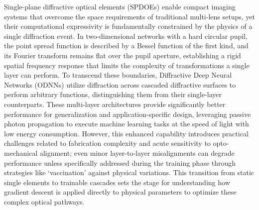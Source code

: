 \documentclass[11pt]{article}
\begin{document}
Single-plane diffractive optical elements (SPDOEs) enable compact imaging systems that overcome the space requirements of traditional multi-lens setups, yet their computational expressivity is fundamentally constrained by the physics of a single diffraction event. In two-dimensional networks with a hard circular pupil, the point spread function is described by a Bessel function of the first kind, and its Fourier transform remains flat over the pupil aperture, establishing a rigid spatial frequency response that limits the complexity of transformations a single layer can perform. To transcend these boundaries, Diffractive Deep Neural Networks (ODNNs) utilize diffraction across cascaded diffractive surfaces to perform arbitrary functions, distinguishing them from their single-layer counterparts. \citep{doi_10_1186_s43593_025_00113_w_ca9e8e1e} These multi-layer architectures provide significantly better performance for generalization and application-specific design, leveraging passive photon propagation to execute machine learning tasks at the speed of light with low energy consumption. However, this enhanced capability introduces practical challenges related to fabrication complexity and acute sensitivity to opto-mechanical alignment; even minor layer-to-layer misalignments can degrade performance unless specifically addressed during the training phase through strategies like `vaccination' against physical variations. This transition from static single elements to trainable cascades sets the stage for understanding how gradient descent is applied directly to physical parameters to optimize these complex optical pathways. \citep{s2_7caf7c29ac69aa12038f926409fb469f65ebeb2a_e9ce584d} \citep{doi_10_1364_oe_579297_3ffb4db0} \citep{doi_10_1364_oe_446890_26d35f03} \citep{doi_10_1515_nanoph_2020_0291_c4a9f42d} \citep{doi_10_1364_optica_576204_30060082}
\end{document}
